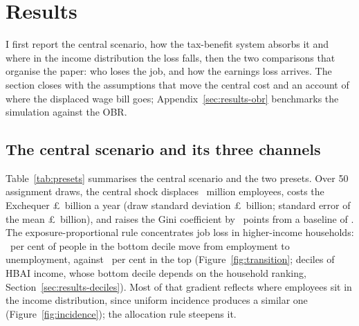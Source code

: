 \section{Results}
\label{sec:results}

I first report the central scenario, how the tax-benefit system absorbs it and where in the income distribution the loss falls, then the two comparisons that organise the paper: who loses the job, and how the earnings loss arrives. The section closes with the assumptions that move the central cost and an account of where the displaced wage bill goes; Appendix~\ref{sec:results-obr} benchmarks the simulation against the OBR.

\subsection{The central scenario and its three channels}
\label{sec:results-channels}

Table~\ref{tab:presets} summarises the central scenario and the two presets. Over 50 assignment draws, the central shock displaces \genCentralMcDisplacedMeanM~million employees, costs the Exchequer \pounds\genCentralMcCostMeanBn~billion a year (draw standard deviation \pounds\genCentralMcCostSdBn~billion; standard error of the mean \pounds\genCentralMcCostSeBn~billion), and raises the Gini coefficient by \genCentralMcGiniMeanPp~points from a baseline of \genBaselineGini. The exposure-proportional rule concentrates job loss in higher-income households: \genTransDOnePct~per cent of people in the bottom decile move from employment to unemployment, against \genTransDTenPct~per cent in the top (Figure~\ref{fig:transition}; deciles of HBAI income, whose bottom decile depends on the household ranking, Section~\ref{sec:results-deciles}). Most of that gradient reflects where employees sit in the income distribution, since uniform incidence produces a similar one (Figure~\ref{fig:incidence}); the allocation rule steepens it.

